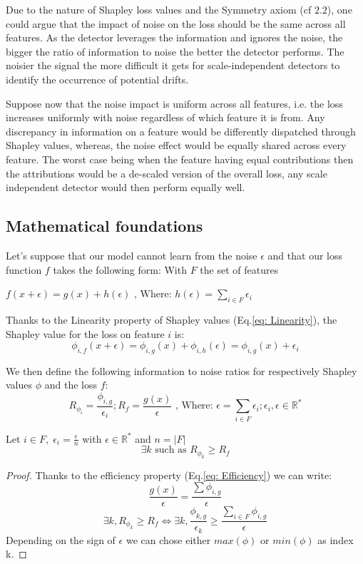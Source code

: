 \documentclass[runningheads]{llncs}
\begin{document}
    Due to the nature of Shapley loss values and the Symmetry axiom (cf $2.2$), one could argue that the impact of noise on the loss should be the same across all features. 
    As the detector leverages the information and ignores the noise, the bigger the ratio of information to noise the better the detector performs. The noisier the signal the more difficult it gets for scale-independent detectors to identify the occurrence of potential drifts.

    Suppose now that the noise impact is uniform across all features, i.e. the loss increases uniformly with noise regardless of which feature it is from. Any discrepancy in information on a feature would be differently dispatched through Shapley values, whereas, the noise effect would be equally shared across every feature.
    The worst case being when the feature having equal contributions then the attributions would be a de-scaled version of the overall loss, any scale independent detector would then perform equally well.

\subsection{Mathematical foundations}
Let's suppose that our model cannot learn from the noise $\epsilon$ and that our loss function $f$ takes the following form: With $F$ the set of features

\begin{center}
    $f(x+\epsilon) = g(x)+h(\epsilon) \text{ , Where: } h(\epsilon) = \sum_{i\in F}{\epsilon_i}$
\end{center}

Thanks to the Linearity property of Shapley values (Eq.\ref{eq: Linearity}), the Shapley value for the loss on feature $i$ is:
$$\phi_{i,f}(x+\epsilon)= \phi_{i,g}(x) + \phi_{i,h}(\epsilon) = \phi_{i,g}(x) + \epsilon_i$$

We then define the following information to noise ratios for respectively Shapley values $\phi$ and the loss $f$:
$$R_{\phi_i} = \frac{\phi_{i,g}}{\epsilon_i} ; 
R_{f} = \frac{g(x)}{\epsilon} \text{ , Where: } \epsilon = \sum_{i \in F}{\epsilon_i}; \epsilon_i, \epsilon \in \mathbb{R}^*
$$
\begin{theorem} Let $i \in F,\; \epsilon_i = \frac{\epsilon}{n}$ with $ \epsilon \in \mathbb{R}^* $ and $n = |F|$
$$
\exists k \textrm{ such as } R_{\phi_k} \geq R_f
$$
\end{theorem}
\begin{proof}
Thanks to the efficiency property (Eq.\ref{eq: Efficiency}) we can write:
\[\frac{g(x)}{\epsilon}=\frac{\sum{\phi_{i,g}}}{\epsilon}\]
\[\exists k, R_{\phi_k} \geq R_f \iff \exists k, \frac{\phi_{k,g}}{\epsilon_k} \geq \frac{\sum_{i \in F}{\phi_{i,g}}}{\epsilon}\]
Depending on the sign of $\epsilon$  we can chose either $max(\phi)$ or $min(\phi)$ as index k.
\end{proof}
\end{document}
